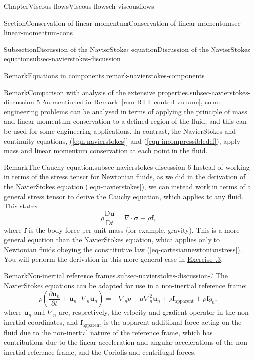 \documentclass[oneside,10pt,]{book}
\newcommand{\xreffont}{\relax}
\numberwithin{equation}{section}
\newcommand{\DD}[2]{\frac{\mathrm{D}#1}{\mathrm{D}#2}}
\newcommand{\pd}[2]{\frac{\partial#1}{\partial#2}}
\newcommand{\bu}{\boldsymbol{u}}
\renewcommand{\bf}{\boldsymbol{f}}
\newcommand{\bsigma}{\boldsymbol{\sigma}}
\begin{document}
\begin{chapterptx}{Chapter}{Viscous flows}{}{Viscous flows}{}{}{ch-viscousflows}
\begin{sectionptx}{Section}{Conservation of linear momentum}{}{Conservation of linear momentum}{}{}{sec-linear-momentum-cons}
\begin{subsectionptx}{Subsection}{Discussion of the Navier\textendash{}Stokes equation}{}{Discussion of the Navier\textendash{}Stokes equation}{}{}{subsec-navierstokes-discussion}
\begin{remark}{Remark}{Equations in components.}{remark-navierstokes-components}
\end{remark}
\begin{remark}{Remark}{Comparison with analysis of the extensive properties.}{subsec-navierstokes-discussion-5}%
As mentioned in \hyperref[rem-RTT-control-volume]{Remark~{\xreffont\ref{rem-RTT-control-volume}}}, some engineering problems can be analysed in terms of applying the principle of mass and linear momentum conservation to a defined region of the fluid, and this can be used for some engineering applications. In contrast, the Navier\textendash{}Stokes and continuity equations, \hyperref[eqn-navierstokes]{({\xreffont\ref{eqn-navierstokes}})} and \hyperref[eqn-incompressibledef]{({\xreffont\ref{eqn-incompressibledef}})}, apply mass and linear momentum conservation at each point in the fluid.%
\end{remark}
\begin{remark}{Remark}{The Cauchy equation.}{subsec-navierstokes-discussion-6}%
Instead of working in terms of the stress tensor for Newtonian fluids, as we did in the derivation of the Navier\textendash{}Stokes equation \hyperref[eqn-navierstokes]{({\xreffont\ref{eqn-navierstokes}})}, we can instead work in terms of a general stress tensor to derive the Cauchy equation, which applies to any fluid. This states%
\begin{equation}
\rho\DD{\bu}{t}=\nabla\cdot\bsigma+\rho\bf,\label{eqn-cauchy-equation}
\end{equation}
where \(\bf\) is the body force per unit mass (for example, gravity). This is a more general equation than the Navier\textendash{}Stokes equation, which applies only to Newtonian fluids obeying the consititutive law \hyperref[eq-cartesiannewtonianstress]{({\xreffont\ref{eq-cartesiannewtonianstress}})}. You will perform the derivation in this more general case in \hyperlink{ps-Cauchy-equation}{Exercise~{\xreffont 7.6.3}}.%
\end{remark}
\begin{remark}{Remark}{Non-inertial reference frames.}{subsec-navierstokes-discussion-7}%
The Navier\textendash{}Stokes equations can be adapted for use in a non-inertial reference frame:%
\begin{equation*}
\rho\left(\pd{\bu_n}{t}+\bu_n\cdot\nabla_n\bu_n\right)
=-\nabla_n p+\mu\nabla_n^2\bu_n+\rho\bf_{\textrm{apparent}}+\rho{\bf g}_n,
\end{equation*}
where \(\bu_n\) and \(\nabla_n\) are, respectively, the velocity and gradient operator in the non-inertial coordinates, and \(\bf_{\textrm{apparent}}\) is the apparent additional force acting on the fluid due to the non-inertial nature of the reference frame, which has contributions due to the linear acceleration and angular accelerations of the non-inertial reference frame, and the Coriolis and centrifugal forces.%

\end{remark}
\end{subsectionptx}
\end{sectionptx}
\end{chapterptx}
\end{document}
